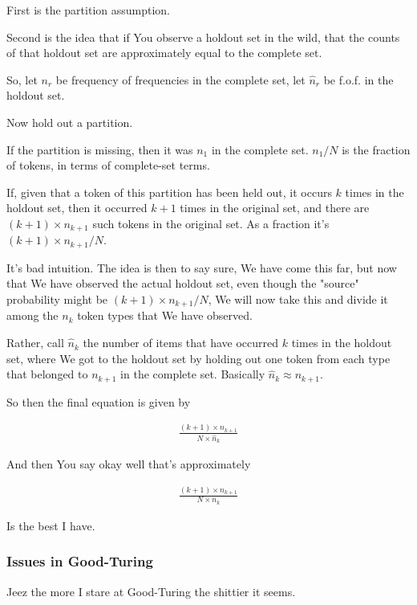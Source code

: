 \documentclass{article}
\begin{document}
			First is the partition assumption.
			
			Second is the idea that if You observe a holdout set in the wild, that the counts of that holdout set are approximately equal to the complete set.
			
			So, let $n_r$ be frequency of frequencies in the complete set, let $\hat{n}_r$ be f.o.f. in the holdout set.
			
			Now hold out a partition.
			
			If the partition is missing, then it was $n_1$ in the complete set. $n_1/N$ is the fraction of tokens, in terms of complete-set terms.
			
			If, given that a token of this partition has been held out, it occurs $k$ times in the holdout set, then it occurred $k+1$ times in the original set, and there are $(k+1)\times n_{k+1}$ such tokens in the original set. As a fraction it's $(k+1)\times n_{k+1}/N$.
			
			It's bad intuition. The idea is then to say sure, We have come this far, but now that We have observed the actual holdout set, even though the "source" probability might be $(k+1)\times n_{k+1}/N$, We will now take this and divide it among the $n_k$ token types that We have observed. 
			
			Rather, call $\hat{n}_k$ the number of items that have occurred $k$ times in the holdout set, where We got to the holdout set by holding out one token from each type that belonged to $n_{k+1}$ in the complete set. Basically $\hat{n}_k\approx n_{k+1}$.
			
			So then the final equation is given by
			
			\begin{align}
				\frac{(k+1)\times n_{k+1}}{N\times \hat{n}_{k}}
			\end{align}
			
			And then You say okay well that's approximately
			
			\begin{align}
				\frac{(k+1)\times n_{k+1}}{N\times n_{k}}
			\end{align}
			
			Is the best I have. 
			
		\subsubsection{Issues in Good-Turing}
		
			Jeez the more I stare at Good-Turing the shittier it seems.
			
\end{document}

